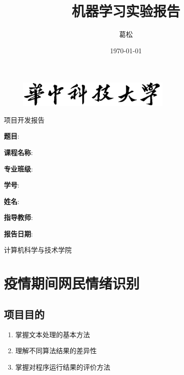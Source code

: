 \documentclass[UTF8]{ctexart}
\title{机器学习实验报告}
\author{葛松}
\date{\today}
\begin{document}
\thispagestyle{empty}
\begin{figure}[htb]
    \centering
    \includegraphics[width=3in]{asset/华中科技大学.png}
\end{figure}

\begin{center}
    \fangsong
    项目开发报告
\end{center}



\vspace*{20mm}
\begin{center}
    \textbf{题目}:\underline{}
\end{center}

\vspace*{70mm}

\begin{center}
    \textbf{课程名称}: \underline{}
    
    \textbf{专业班级}: \underline{}

    \textbf{学\qquad 号}: \underline{}
    
    \textbf{姓\qquad 名}: \underline{}
    
    \textbf{指导教师}: \underline{}
    
    \textbf{报告日期}: \underline{\makebox[15em]{\today}}
\end{center}

\vspace*{50mm}

\begin{center}
    计算机科学与技术学院
\end{center}
\newpage
\thispagestyle{empty}
\tableofcontents
\newpage
\setcounter{page}{1}
\section{疫情期间网民情绪识别}
\subsection{项目目的}
\begin{enumerate}
    \item 掌握文本处理的基本方法
    \item 理解不同算法结果的差异性
    \item 掌握对程序运行结果的评价方法
\end{enumerate}
\end{document}
